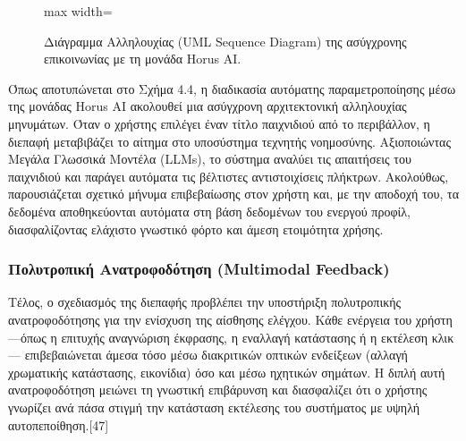 \documentclass[twoside, a4paper, 11pt]{article}
\begin{document}
\begin{figure}[H]
\begin{adjustbox}{max width=\textwidth}
    \end{adjustbox}
    \caption{Διάγραμμα Αλληλουχίας (UML Sequence Diagram) της ασύγχρονης επικοινωνίας με τη μονάδα Horus AI.}
    \label{fig:sequence_horus_ai}
\end{figure}

Όπως αποτυπώνεται στο Σχήμα 4.4, η διαδικασία αυτόματης παραμετροποίησης μέσω της μονάδας Horus AI ακολουθεί μια ασύγχρονη αρχιτεκτονική αλληλουχίας μηνυμάτων. Όταν ο χρήστης επιλέγει έναν τίτλο παιχνιδιού από το περιβάλλον, η διεπαφή μεταβιβάζει το αίτημα στο υποσύστημα τεχνητής νοημοσύνης. Αξιοποιώντας Μεγάλα Γλωσσικά Μοντέλα (LLMs), το σύστημα αναλύει τις απαιτήσεις του παιχνιδιού και παράγει αυτόματα τις βέλτιστες αντιστοιχίσεις πλήκτρων. Ακολούθως, παρουσιάζεται σχετικό μήνυμα επιβεβαίωσης στον χρήστη και, με την αποδοχή του, τα δεδομένα αποθηκεύονται αυτόματα στη βάση δεδομένων του ενεργού προφίλ, διασφαλίζοντας ελάχιστο γνωστικό φόρτο και άμεση ετοιμότητα χρήσης.

\subsubsection{Πολυτροπική Ανατροφοδότηση (Multimodal Feedback)}
Τέλος, ο σχεδιασμός της διεπαφής προβλέπει την υποστήριξη πολυτροπικής ανατροφοδότησης για την ενίσχυση της αίσθησης ελέγχου. 
Κάθε ενέργεια του χρήστη —όπως η επιτυχής αναγνώριση έκφρασης, η εναλλαγή κατάστασης ή η εκτέλεση κλικ— επιβεβαιώνεται άμεσα τόσο μέσω διακριτικών οπτικών ενδείξεων 
(αλλαγή χρωματικής κατάστασης, εικονίδια) όσο και μέσω ηχητικών σημάτων. Η διπλή αυτή ανατροφοδότηση μειώνει τη γνωστική επιβάρυνση και διασφαλίζει ότι ο χρήστης γνωρίζει 
ανά πάσα στιγμή την κατάσταση εκτέλεσης του συστήματος με υψηλή αυτοπεποίθηση.[47]
\end{document}
